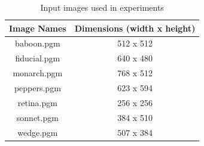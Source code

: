 \documentclass[]{IEEEtran}
\begin{document}
\begin{table}[h!]
\centering
\begin{center}
\begin{tabular}{ |c|c| } 
 \hline
 Image Names & Dimensions (width x height) \\
 \hline
  baboon.pgm &  512 x 512\\ 
 \hline
  fiducial.pgm & 640 x 480\\
 \hline
  monarch.pgm &  768 x 512\\ 
 \hline
  peppers.pgm & 623 x 594\\
 \hline
 retina.pgm & 256 x 256\\
 \hline
 sonnet.pgm & 384 x 510\\
 \hline
 wedge.pgm & 507 x 384\\
 \hline
\end{tabular}
\caption{Input images used in experiments}
\label{table:input}
\end{center}
\end{table}
\end{document}
